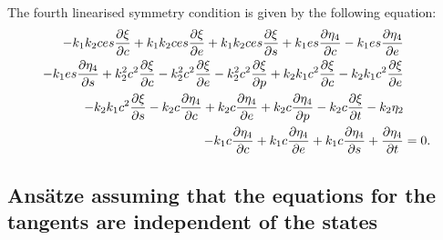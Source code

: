 The fourth linearised symmetry condition is given by the following equation:
\begin{align}
  - k_{1} k_{2} c e s \pdv{\xi}{c} + k_{1} k_{2} c e s \pdv{\xi}{e} + k_{1} k_{2} c e s \pdv{\xi}{s} + k_{1} e s \pdv{\eta_4}{c} - k_{1} e s \pdv{\eta_4}{e}&\nonumber\\
  - k_{1} e s \pdv{\eta_4}{s} + k_{2}^{2} c^{2} \pdv{\xi}{c} - k_{2}^{2} c^{2} \pdv{\xi}{e} - k_{2}^{2} c^{2} \pdv{\xi}{p} + k_{2} k_{1} c^{2} \pdv{\xi}{c} - k_{2} k_{1} c^{2} \pdv{\xi}{e}&\nonumber\\
  - k_{2} k_{1} c^{2} \pdv{\xi}{s} - k_{2} c \pdv{\eta_4}{c} + k_{2} c \pdv{\eta_4}{e} + k_{2} c \pdv{\eta_4}{p} - k_{2} c \pdv{\xi}{t} - k_{2} \eta_2&\nonumber\\
  - k_{1} c \pdv{\eta_4}{c} + k_{1} c \pdv{\eta_4}{e} + k_{1} c \pdv{\eta_4}{s} + \pdv{\eta_4}{t}&=0.
  \label{eq:MM_lin_sym_4}
\end{align}
\subsection{Ans\"atze assuming that the equations for the tangents are independent of the states}

